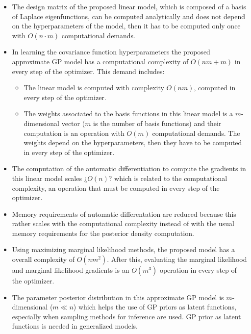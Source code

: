 \documentclass[onecolumn,a4paper,11pt]{article}
\begin{document}
\vspace{2mm}
\begin{itemize}
	\item The design matrix of the proposed linear model, which is composed of a basis of Laplace eigenfunctions, can be computed analytically and does not depend on the hyperparameters of the model, then it has to be computed only once with $O(n\cdot m)$ computational demands.
	
	\item In learning the covariance function hyperparameters the proposed approximate GP model has a computational complexity of $O(nm+m)$ in every step of the optimizer. This demand includes:
	
	\begin{itemize}
		\item The linear model is computed with complexity $O(nm)$, computed in every step of the optimizer.

		\item The weights associated to the basis functions in this linear model is a $m$-dimensional vector ($m$ is the number of basis functions) and their computation is an operation with $O(m)$ computational demands. The weights depend on the hyperparameters, then they have to be computed in every step of the optimizer.
	\end{itemize}
	
	\item The computation of the automatic differentiation to compute the gradients in this linear model scales ¿$O(n)$? which is related to the computational complexity, an operation that must be computed in every step of the optimizer.
	
 	\item Memory requirements of automatic differentation are reduced because this rather scales with the computational complexity instead of with the usual memory requirements for the posterior density computation.
	
	\item Using maximizing marginal likelihood methods, the proposed model has a overall complexity of $O(nm^2)$. After this, evaluating the marginal likelihood and marginal likelihood gradients is an $O(m^3)$ operation in every step of the optimizer.

	\item The parameter posterior distribution in this approximate GP model is $m$-dimensional ($m \ll n$) which helps the use of GP priors as latent functions, especially when sampling methods for inference are used. GP prior as latent functions is needed in generalized models.


\end{itemize}
\end{document}
